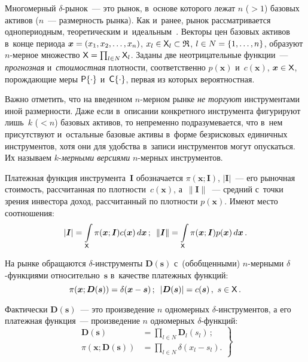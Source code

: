 \begin{multicols}{2}
  Многомерный $\delta$-рынок~--- это рынок, в~\mbox{основе} которого лежат $n$ 
($> 1$) базовых активов ($n$~--- раз\-мер\-ность рынка). Как и~ранее, рынок 
рас\-смат\-ри\-ва\-ет\-ся однопериодным, тео\-ре\-ти\-че\-ским и~идеальным~\cite{4-ag, 5-ag}. 
Векторы цен базовых активов в~конце периода $\boldsymbol{x}\hm= (x_1, x_2, 
\ldots , x_n)$, $x_l \hm\in {\sf X}_l \hm\subset \mathfrak{R}$, $l \hm\in N\hm= \{1, 
\ldots , n\}$, образуют $n$-мер\-ное множество ${\sf X}\hm= \prod\nolimits_{l\in 
N}{\sf X}_l$. Заданы две неотрицательные функции~--- \textit{прогнозная} 
и~\textit{стоимостная} плотности, соответственно $p(\boldsymbol{x})$ 
и~$c(\boldsymbol{x})$, $\boldsymbol{x}\hm\in {\sf X}$, по\-рож\-да\-ющие меры ${\sf P}\{\cdot\}$ 
и~${\sf C}\{\cdot\}$, первая из которых вероятностная. 
  
  Важно отметить, что на введенном $n$-мер\-ном рынке \textit{не торгуют} 
инструментами иной раз\-мер\-ности. Даже если в~описании конкретного 
инструмента фигурируют лишь~$k$ ($< n$) базовых активов, то непременно 
подразумевается, что в~нем присутствуют и~остальные базовые активы в~форме 
безрисковых единичных инструментов, хотя они для удобства в~записи 
инструментов могут опускаться. Их называем $k$-\textit{мер\-ны\-ми версиями} 
$n$-мер\-ных инструментов. 
  
  Платежная функция инструмента~$\boldsymbol{I}$ обозначается 
$\pi(\boldsymbol{x}; \boldsymbol{I})$, $\vert\boldsymbol{I}\vert$~--- его рыночная стоимость, 
рассчитанная по плот\-ности~$c(\boldsymbol{x})$, а~$\|\boldsymbol{I}\|$~--- средний с~точки 
зрения инвестора доход, рассчитанный по плот\-ности $p(\boldsymbol{x})$. Имеют место 
соотношения:
  $$
  \vert\boldsymbol{I} \vert=  \int\limits_{{\sf X}}\pi (\boldsymbol{x};\boldsymbol{I}) 
c(\boldsymbol{x})\,d\boldsymbol{x}\,;\enskip \| \boldsymbol{I}\| =\int\limits_{{\sf X}}\pi(\boldsymbol{x};\boldsymbol{I}) 
p(\boldsymbol{x})\,d\boldsymbol{x}\,.
  $$
  
  На рынке обращаются $\delta$-ин\-стру\-мен\-ты $\boldsymbol{D}(\boldsymbol{s})$ 
с~(обобщенными) $n$-мер\-ны\-ми $\delta$-функ\-ци\-ями 
относительно~$\boldsymbol{s}$ в~качестве платежных функций: 
  $$
  \pi(\boldsymbol{x};\boldsymbol{D}(\boldsymbol{s}))=\delta(\boldsymbol{x}-\boldsymbol{s})\,;\enskip \vert 
\boldsymbol{D}(\boldsymbol{s})\vert=c(\boldsymbol{s})\,, \ s\in{\sf X}\,.
  $$
  
  Фактически $\boldsymbol{D}(\boldsymbol{s})$~--- это произведение $n$ одномерных  
$\delta$-ин\-стру\-мен\-тов, а его платежная функция~--- произведение $n$ 
одномерных $\delta$-функ\-ций: 
  \begin{equation}
  \left.
  \begin{array}{rl}
  \boldsymbol{D}(\boldsymbol{s})&=\prod\limits_{l\in N} \boldsymbol{D}_l\left(s_l\right)\,;\\[8pt]
\pi(\boldsymbol{x};\boldsymbol{D}(\boldsymbol{s}))&=\prod_{l\in N} \delta \left( x_l-s_l\right).
\end{array}
\right\}
  \label{e1-ag}
  \end{equation}
  

\end{multicols}
